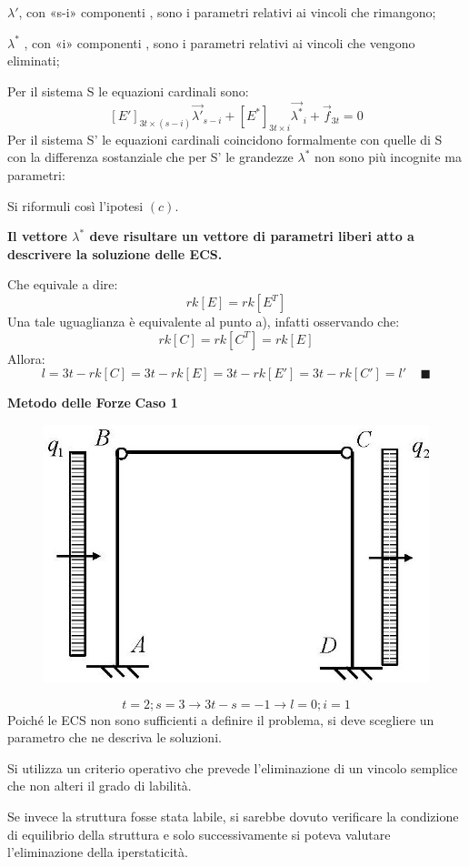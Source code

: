 \documentclass{article}
\begin{document}
\begin{adjustwidth}{2in}{}
		$ \lambda' $, con «s-i» componenti , sono i parametri relativi ai vincoli che rimangono;
		
		$ \lambda^* $ , con «i» componenti , sono i parametri relativi ai vincoli che vengono eliminati;
		
		Per il sistema S le equazioni cardinali sono:
		\[[E']_{3t \times (s-i)} \vec{\lambda'}_{s-i} +  [E^*]_{3t \times i} \vec{\lambda^*}_{i} + \vec{f}_{3t} = 0 \]
		Per il sistema S' le equazioni cardinali coincidono formalmente con quelle di S con la differenza
		sostanziale che per S' le grandezze $ \lambda^* $ non sono più incognite ma parametri:
		
		Si riformuli così l'ipotesi $ (c) $.
		
\textbf{Il vettore $ \lambda^* $ deve risultare un vettore di parametri liberi atto a descrivere la soluzione delle ECS.}
		
		Che equivale a dire:
		\[rk[E] = rk[E^T]\]
		Una tale uguaglianza è equivalente al punto a), infatti osservando che:
		\[rk[C] = rk[C^T] = rk[E]\]
		Allora:
		\[ l = 3t - rk[C] = 3t - rk[E] = 3t - rk[E'] = 3t -rk[C'] = l' ~~~~~ \blacksquare \]
	
{\Large \textbf{Metodo delle Forze}} \newline 
\textbf{Caso 1}

\begin{figure}[H]
	\centering
	\includegraphics[width=0.4\linewidth]{"immagini/1.PARTE8_Pagina_52 (2)"}	
\end{figure}

		\[ t =2; s = 3 \rightarrow 3t-s = -1 \rightarrow l = 0; i = 1 \]
		Poiché le ECS non sono sufficienti a definire il
		problema, si deve scegliere un parametro che
		ne descriva le soluzioni.
		
		Si utilizza un criterio operativo che prevede l'eliminazione di un
		vincolo semplice che non alteri il grado di
		labilità.
		
		Se invece la struttura fosse stata labile, si sarebbe
		dovuto verificare la condizione di equilibrio
		della struttura e solo successivamente si poteva
		valutare l’eliminazione della iperstaticità.
		

\end{adjustwidth}
\end{document}

